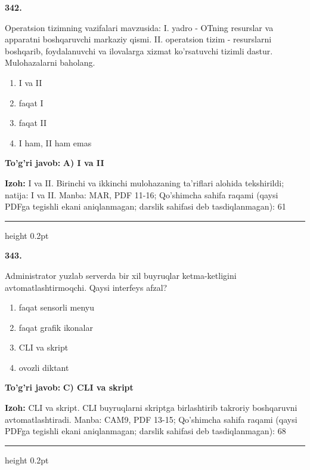 \documentclass[10pt,a4paper]{article}
\begin{document}
{\bfseries\sffamily\color{ink} 342.}
\par
Operatsion tizimning vazifalari mavzusida: I. yadro - OTning resurslar va apparatni boshqaruvchi markaziy qismi. II. operatsion tizim - resurslarni boshqarib, foydalanuvchi va ilovalarga xizmat ko'rsatuvchi tizimli dastur. Mulohazalarni baholang.
\begin{enumerate}[label=\Alph*),leftmargin=9mm]
\item I va II
\item faqat I
\item faqat II
\item I ham, II ham emas
\end{enumerate}
\begin{tcolorbox}[enhanced,breakable,colback=teal!4,colframe=teal!60!black,boxrule=0.45pt,arc=1.2mm,left=2.7mm,right=2.7mm,top=1.8mm,bottom=1.8mm,before skip=2mm,after skip=2mm]
{\bfseries\sffamily\color{teal}To'g'ri javob:} \textbf{A) I va II}
\par\smallskip
{\bfseries Izoh:} I va II. Birinchi va ikkinchi mulohazaning ta'riflari alohida tekshirildi; natija: I va II. Manba: MAR, PDF 11-16; Qo'shimcha sahifa raqami (qaysi PDFga tegishli ekani aniqlanmagan; darslik sahifasi deb tasdiqlanmagan): 61
\end{tcolorbox}
\vspace{2mm}\hrule height 0.2pt\vspace{3mm}

{\bfseries\sffamily\color{ink} 343.}
\par
Administrator yuzlab serverda bir xil buyruqlar ketma-ketligini avtomatlashtirmoqchi. Qaysi interfeys afzal?
\begin{enumerate}[label=\Alph*),leftmargin=9mm]
\item faqat sensorli menyu
\item faqat grafik ikonalar
\item CLI va skript
\item ovozli diktant
\end{enumerate}
\begin{tcolorbox}[enhanced,breakable,colback=teal!4,colframe=teal!60!black,boxrule=0.45pt,arc=1.2mm,left=2.7mm,right=2.7mm,top=1.8mm,bottom=1.8mm,before skip=2mm,after skip=2mm]
{\bfseries\sffamily\color{teal}To'g'ri javob:} \textbf{C) CLI va skript}
\par\smallskip
{\bfseries Izoh:} CLI va skript. CLI buyruqlarni skriptga birlashtirib takroriy boshqaruvni avtomatlashtiradi. Manba: CAM9, PDF 13-15; Qo'shimcha sahifa raqami (qaysi PDFga tegishli ekani aniqlanmagan; darslik sahifasi deb tasdiqlanmagan): 68
\end{tcolorbox}
\vspace{2mm}\hrule height 0.2pt\vspace{3mm}
\end{document}
